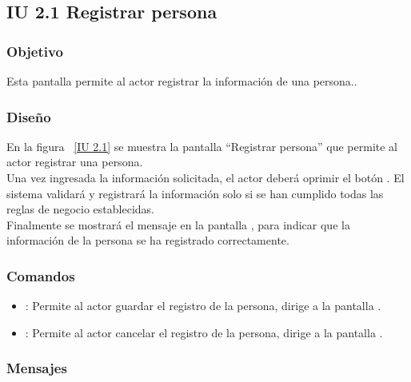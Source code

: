 \subsection{IU 2.1 Registrar persona}

\subsubsection{Objetivo}
	
    Esta pantalla permite al actor registrar la información de una persona..

\subsubsection{Diseño}

    En la figura ~\ref{IU 2.1} se muestra la pantalla ``Registrar persona'' que permite al actor registrar una persona. \\
    
    Una vez ingresada la información solicitada, el actor deberá oprimir el botón . El sistema validará y registrará la 
    información solo si se han cumplido todas las reglas de negocio establecidas.  \\
    
    Finalmente se mostrará el mensaje  en la pantalla , 
    para indicar que la información de la persona
    se ha registrado correctamente.        



\subsubsection{Comandos}
\begin{itemize}
	\item {}: Permite al actor guardar el registro de la persona, dirige a la pantalla .
	\item {}: Permite al actor cancelar el registro de la persona, dirige a la pantalla .
\end{itemize}

\subsubsection{Mensajes}
	
